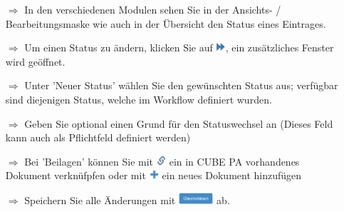 \documentclass{article}
\begin{document}
\begin{multicols}{2}
\begin{tcolorbox}[colback=blue!5,colframe=blue!40!black,title=Workflows anwenden]
\begin{itemize}
  \item[$\Longrightarrow$] In den verschiedenen Modulen sehen Sie in der Ansichts- / Bearbeitungsmaske wie auch in der Übersicht den Status eines Eintrages.
  \item[$\Longrightarrow$] Um einen Status zu ändern, klicken Sie auf \includegraphics[height=10pt]{Icons/Status_Aendern.png}, ein zusätzliches Fenster wird geöffnet.
  \item[$\Longrightarrow$] Unter 'Neuer Status' wählen Sie den gewünschten Status aus; verfügbar sind diejenigen Status, welche im Workflow definiert wurden.
	\item[$\Longrightarrow$] Geben Sie optional einen Grund für den Statuswechsel an (Dieses Feld kann auch als Pflichtfeld definiert werden)
	\item[$\Longrightarrow$] Bei 'Beilagen' können Sie mit \includegraphics[height=10pt]{Icons/Link.png} ein in CUBE PA vorhandenes Dokument verknüfpfen oder mit \includegraphics[height=10pt]{Icons/Pluszeichen.png} ein neues Dokument hinzufügen
	\item[$\Longrightarrow$] Speichern Sie alle Änderungen mit \includegraphics[height=12pt]{Icons/B_Uebernehmen.jpg} ab.
\end{itemize}
\end{tcolorbox}


\end{multicols}




\pagebreak
{}

\vspace{\baselineskip}
\end{document}
